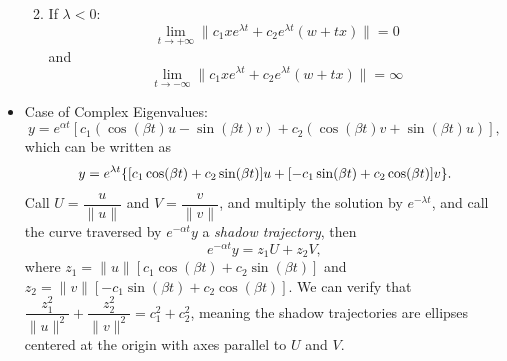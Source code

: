 \documentclass[12pt, a4paper]{article}
\begin{document}
\begin{itemize}
\begin{enumerate}
\begin{figure}[H]
			\hfill
		\end{figure}
		\item If $\lambda<0$: \[\lim_{t\to+\infty}\|c_1xe^{\lambda t}+c_2e^{\lambda t}(w+tx)\|=0\] and \[\lim_{t\to-\infty}\|c_1xe^{\lambda t}+c_2e^{\lambda t}(w+tx)\|=\infty\]
	\end{enumerate}
	\item Case of Complex Eigenvalues: \[y=e^{\alpha t}[c_1(\cos(\beta t)u-\sin(\beta t)v)+c_2(\cos(\beta t)v+\sin(\beta t)u)],\] which can be written as \[y=e^{\lambda t}\qty{[c_1\cos(\beta t)+c_2\sin(\beta t)]u+[-c_1\sin(\beta t)+c_2\cos(\beta t)]v}.\] Call $U=\dfrac{u}{\|u\|}$ and $V=\dfrac{v}{\|v\|}$, and multiply the solution by $e^{-\lambda t}$, and call the curve traversed by $e^{-\alpha t}y$ a \textit{shadow trajectory}, then \[e^{-\alpha t}y=z_1U+z_2V,\] where $z_1=\|u\|[c_1\cos(\beta t)+c_2\sin(\beta t)]$ and $z_2=\|v\|[-c_1\sin(\beta t)+c_2\cos(\beta t)]$. We can verify that $\dfrac{z_1^2}{\|u\|^2}+\dfrac{z_2^2}{\|v\|^2}=c_1^2+c_2^2$, meaning the shadow trajectories are ellipses centered at the origin with axes parallel to $U$ and $V$. 
	\begin{figure}[H]\centering
		\label{fig14}
		\label{fig15}

\end{figure}
\end{itemize}
\end{document}
